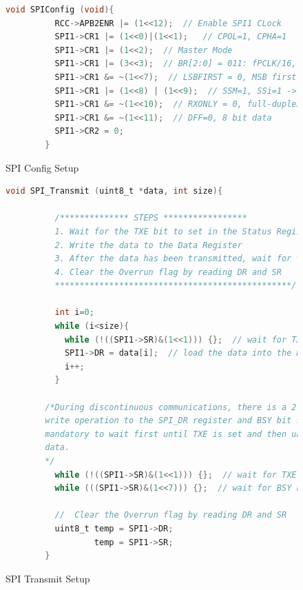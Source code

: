 \documentclass{report}
\begin{document}
    \begin{figure}
      \begin{lstlisting}[language=C]
        void SPIConfig (void){
          RCC->APB2ENR |= (1<<12);  // Enable SPI1 CLock
          SPI1->CR1 |= (1<<0)|(1<<1);   // CPOL=1, CPHA=1
          SPI1->CR1 |= (1<<2);  // Master Mode
          SPI1->CR1 |= (3<<3);  // BR[2:0] = 011: fPCLK/16, PCLK2 = 80MHz, SPI clk = 5MHz
          SPI1->CR1 &= ~(1<<7);  // LSBFIRST = 0, MSB first
          SPI1->CR1 |= (1<<8) | (1<<9);  // SSM=1, SSi=1 -> Software Slave Management
          SPI1->CR1 &= ~(1<<10);  // RXONLY = 0, full-duplex
          SPI1->CR1 &= ~(1<<11);  // DFF=0, 8 bit data
          SPI1->CR2 = 0;
        }
	    \end{lstlisting}
     \caption{SPI Config Setup}
     \label{fig:SPIConfig}
    \end{figure}

    \newpage

    \begin{figure}
      \begin{lstlisting}[language=C]
        void SPI_Transmit (uint8_t *data, int size){

          /************** STEPS *****************
          1. Wait for the TXE bit to set in the Status Register
          2. Write the data to the Data Register
          3. After the data has been transmitted, wait for the BSY bit to reset in Status Register
          4. Clear the Overrun flag by reading DR and SR
          ************************************************/

          int i=0;
          while (i<size){
            while (!((SPI1->SR)&(1<<1))) {};  // wait for TXE bit to set -> This will indicate that the buffer is empty
            SPI1->DR = data[i];  // load the data into the Data Register
            i++;
          }

        /*During discontinuous communications, there is a 2 APB clock period delay between the
        write operation to the SPI_DR register and BSY bit setting. As a consequence it is
        mandatory to wait first until TXE is set and then until BSY is cleared after writing the last
        data.
        */
          while (!((SPI1->SR)&(1<<1))) {};  // wait for TXE bit to set -> This will indicate that the buffer is empty
          while (((SPI1->SR)&(1<<7))) {};  // wait for BSY bit to Reset -> This will indicate that SPI is not busy in communication

          //  Clear the Overrun flag by reading DR and SR
          uint8_t temp = SPI1->DR;
                  temp = SPI1->SR;
        }
      \end{lstlisting}
      \caption{SPI Transmit Setup}
      \label{fig:SPI_Transmit}
    \end{figure}
\end{document}
